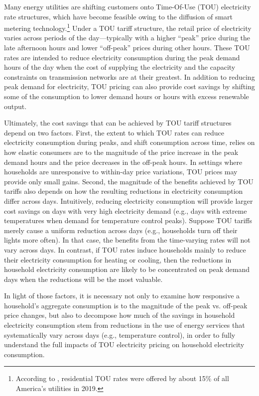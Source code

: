 Many energy utilities are shifting customers onto Time-Of-Use (TOU) electricity rate structures, which have become feasible owing to the diffusion of smart metering technology.\footnote{According to \cite{A-Survey-of-Residential-TOU-Rates_FHS_2019}, residential TOU rates were offered by about 15\% of all America's utilities in 2019.} Under a TOU tariff structure, the retail price of electricity varies across periods of the day---typically with a higher ``peak'' price during the late afternoon hours and lower ``off-peak'' prices during other hours. These TOU rates are intended to reduce electricity consumption during the peak demand hours of the day when the cost of supplying the electricity and the capacity constraints on transmission networks are at their greatest. In addition to reducing peak demand for electricity, TOU pricing can also provide cost savings by shifting some of the consumption to lower demand hours or hours with excess renewable output. 

Ultimately, the cost savings that can be achieved by TOU tariff structures depend on two factors. First, the extent to which TOU rates can reduce electricity consumption during peaks, and shift consumption across time, relies on how elastic consumers are to the magnitude of the price increase in the peak demand hours and the price decreases in the off-peak hours. In settings where households are unresponsive to within-day price variations, TOU prices may provide only small gains. Second, the magnitude of the benefits achieved by TOU tariffs also depends on how the resulting reductions in electricity consumption differ across days. Intuitively, reducing electricity consumption will provide larger cost savings on days with very high electricity demand (e.g., days with extreme temperatures when demand for temperature control peaks). Suppose TOU tariffs merely cause a uniform reduction across days (e.g., households turn off their lights more often). In that case, the benefits from the time-varying rates will not vary across days. In contrast, if TOU rates induce households mainly to reduce their electricity consumption for heating or cooling, then the reductions in household electricity consumption are likely to be concentrated on peak demand days when the reductions will be the most valuable. 

In light of those factors, it is necessary not only to examine how responsive a household's aggregate consumption is to the magnitude of the peak vs. off-peak price changes, but also to decompose how much of the savings in household electricity consumption stem from reductions in the use of energy services that systematically vary across days (e.g., temperature control), in order to fully understand the full impacts of TOU electricity pricing on household electricity consumption. 


